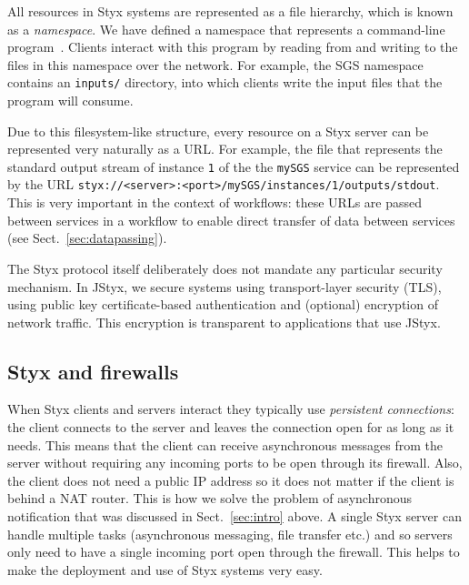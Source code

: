 \documentclass{llncs}
\begin{document}
All resources in Styx systems are represented as a file hierarchy, which is known as a {\em namespace\/}.  We have defined a namespace that represents a command-line program~\cite{blower:2005}.  Clients interact with this program by reading from and writing to the files in this namespace over the network.  For example, the SGS namespace contains an {\tt inputs/} directory, into which clients write the input files that the program will consume. 

Due to this filesystem-like structure, every resource on a Styx server can be represented very naturally as a URL.  For example, the file that represents the standard output stream of instance {\tt 1} of the the {\tt mySGS} service can be represented by the URL {\tt styx://<server>:<port>/mySGS/instances/1/outputs/stdout}.  This is very important in the context of workflows: these URLs are passed between services in a workflow to enable direct transfer of data between services (see Sect.~\ref{sec:datapassing}).

The Styx protocol itself deliberately does not mandate any particular security mechanism.  In JStyx, we secure systems using transport-layer security (TLS), using public key certificate-based authentication and (optional) encryption of network traffic.  This encryption is transparent to applications that use JStyx.

\subsection{Styx and firewalls}\label{sec:styx-firewalls}
When Styx clients and servers interact they typically use {\em persistent connections\/}: the client connects to the server and leaves the connection open for as long as it needs.  This means that the client can receive asynchronous messages from the server without requiring any incoming ports to be open through its firewall.  Also, the client does not need a public IP address so it does not matter if the client is behind a NAT router.  This is how we solve the problem of asynchronous notification that was discussed in Sect.~\ref{sec:intro} above.  A single Styx server can handle multiple tasks (asynchronous messaging, file transfer etc.) and so servers only need to have a single incoming port open through the firewall.  This helps to make the deployment and use of Styx systems very easy.
\end{document}
